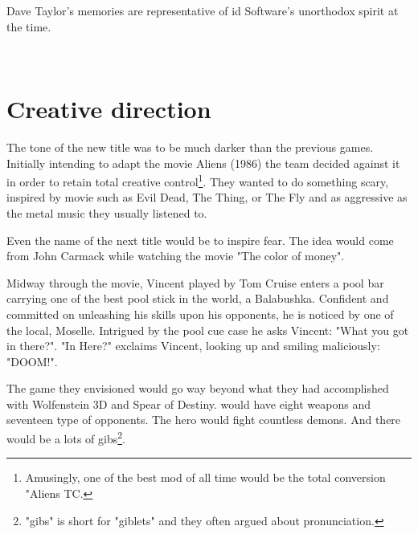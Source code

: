 Dave Taylor's memories are representative of id Software's unorthodox spirit at the time.\\
\par
\vspace{11pt}
\\
\par
\vspace{11pt}





\section{Creative direction}
The tone of the new title was to be much darker than the previous games. Initially intending to adapt the movie Aliens (1986) the team decided against it in order to retain total creative control\footnote{Amusingly, one of the best mod of all time would be the total conversion "Aliens TC.}. They wanted to do something scary, inspired by movie such as Evil Dead, The Thing, or The Fly and as aggressive as the metal music they usually listened to.\\
\par
Even the name of the next title would be to inspire fear. The idea would come from John Carmack while watching the movie "The color of money".\\ 
\par
Midway through the movie, Vincent played by Tom Cruise enters a pool bar carrying one of the best pool stick in the world, a Balabushka. Confident and committed on unleashing his skills upon his opponents, he is noticed by one of the local, Moselle. Intrigued by the pool cue case he asks Vincent: "What you got in there?". "In Here?" exclaims Vincent, looking up and smiling maliciously: "DOOM!".\\
\par

\par
{}
\par
\vspace{-5pt}
The game they envisioned would go way beyond what they had accomplished with Wolfenstein 3D and Spear of Destiny. \doom{} would have eight weapons and seventeen type of opponents. The hero would fight countless demons. And there would be a lots of gibs\footnote{"gibs" is short for "giblets" and they often argued about pronunciation.}.

